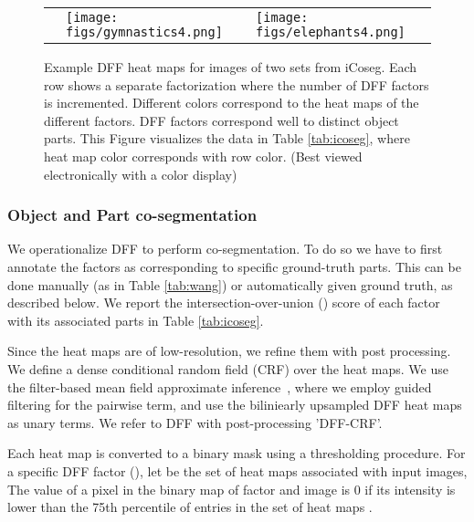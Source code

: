 \documentclass[runningheads]{llncs}
\begin{document}
\begin{figure}[t]
\begin{tabular}{lcc}
			\rotatebox[origin=c]{90}{\footnotesize}\normalsize& \multicolumn{1}{l|}{\begin{minipage}{0.48\textwidth}\texttt{[image: figs/gymnastics4.png]}\end{minipage}}  & \multicolumn{1}{l}{\begin{minipage}{0.48\textwidth}\texttt{[image: figs/elephants4.png]}\end{minipage}}  \\
			

		\end{tabular}
		
		\caption{Example DFF heat maps for images of two sets from iCoseg. Each row shows a separate factorization where the number of DFF factors  is incremented. Different colors correspond to the heat maps of the  different factors. DFF factors correspond well to distinct object parts. This Figure visualizes the data in Table \ref{tab:icoseg}, where heat map color corresponds with row color. (Best viewed electronically with a color display)}  \label{fig:icoseg2}
		
	\end{figure}
	
	\subsubsection{Object and Part co-segmentation}
	We operationalize DFF to perform co-segmentation. To do so we have to first annotate the factors as corresponding to specific ground-truth parts. This can be done manually (as in Table \ref{tab:wang}) or automatically given ground truth, as described below. We report the intersection-over-union () score of each factor with its associated parts in Table \ref{tab:icoseg}.
	
	Since the heat maps are of low-resolution, we refine them with post processing. We define a dense conditional random field (CRF) over the heat maps. We use the filter-based mean field approximate inference~\cite{krahenbuhl2011efficient}, where we employ guided filtering \cite{he2013guided} for the pairwise term, and use the biliniearly upsampled DFF heat maps as unary terms. We refer to DFF with post-processing 'DFF-CRF'.
	
	Each heat map is converted to a binary mask using a thresholding procedure. For a specific DFF factor  (), let  be the set of  heat maps associated with  input images, The value of a pixel in the binary map  of factor  and image  is 0 if its intensity is lower than the 75th percentile of entries in the set of heat maps .
	
\end{document}
